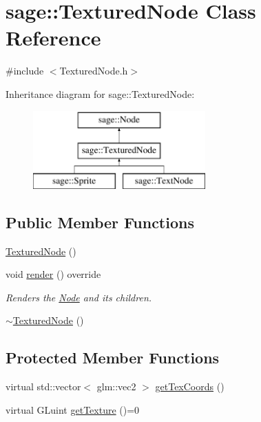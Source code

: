 \hypertarget{classsage_1_1TexturedNode}{}\section{sage\+::Textured\+Node Class Reference}
\label{classsage_1_1TexturedNode}


{\ttfamily \#include $<$Textured\+Node.\+h$>$}

Inheritance diagram for sage\+::Textured\+Node\+:\begin{figure}[H]
\begin{center}
\leavevmode
\includegraphics[height=3.000000cm]{classsage_1_1TexturedNode}
\end{center}
\end{figure}
\subsection*{Public Member Functions}
\begin{DoxyCompactItemize}
\item 
\mbox{\hyperlink{classsage_1_1TexturedNode_a90aacfe1eb94e56ecf8176d7c7b74388}{Textured\+Node}} ()
\item 
void \mbox{\hyperlink{classsage_1_1TexturedNode_a17465d5cb984880866f90145bb93d928}{render}} () override
\begin{DoxyCompactList}\small\item\em Renders the \mbox{\hyperlink{classsage_1_1Node}{Node}} and its children. \end{DoxyCompactList}\item 
\mbox{\hyperlink{classsage_1_1TexturedNode_a2c67c0ec8c8839308a56e0aea6839b3e}{$\sim$\+Textured\+Node}} ()
\end{DoxyCompactItemize}
\subsection*{Protected Member Functions}
\begin{DoxyCompactItemize}
\item 
virtual std\+::vector$<$ glm\+::vec2 $>$ \mbox{\hyperlink{classsage_1_1TexturedNode_ada858d240f8074fd97e8a72e74d18a30}{get\+Tex\+Coords}} ()
\item 
virtual G\+Luint \mbox{\hyperlink{classsage_1_1TexturedNode_a079cea0b12a1d0e3ea69459546736c0f}{get\+Texture}} ()=0
\end{DoxyCompactItemize}
